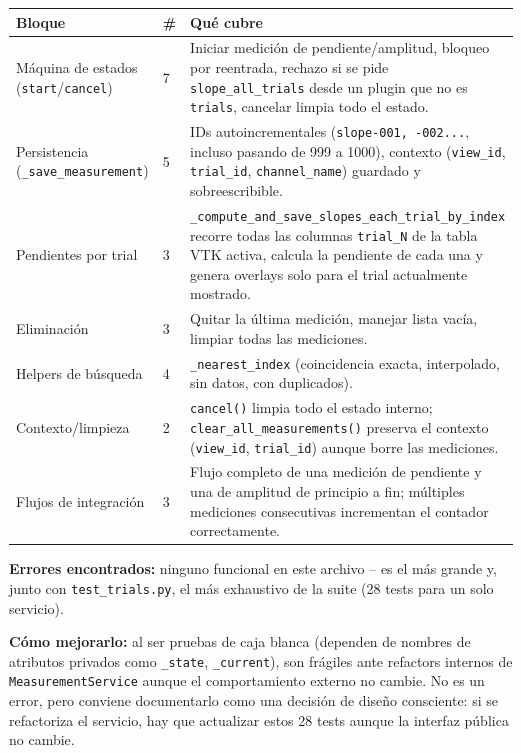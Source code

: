 \documentclass[11pt,a4paper]{article}
\begin{document}
\begin{center}
\begin{longtable}{L{4.5cm}p{1cm}L{7.5cm}}
\toprule
\textbf{Bloque} & \textbf{\#} & \textbf{Qué cubre} \\
\midrule
\endhead
Máquina de estados (\texttt{start}/\texttt{cancel}) & 7 & Iniciar medición de pendiente/amplitud, bloqueo por reentrada, rechazo si se pide \texttt{slope\_\allowbreak all\_\allowbreak trials} desde un plugin que no es \texttt{trials}, cancelar limpia todo el estado. \\
Persistencia (\texttt{\_\allowbreak save\_\allowbreak measurement}) & 5 & IDs autoincrementales (\texttt{slope-001, -002...}, incluso pasando de 999 a 1000), contexto (\texttt{view\_\allowbreak id}, \texttt{trial\_\allowbreak id}, \texttt{channel\_\allowbreak name}) guardado y sobreescribible. \\
Pendientes por trial & 3 & \texttt{\_\allowbreak compute\_\allowbreak and\_\allowbreak save\_\allowbreak slopes\_\allowbreak each\_\allowbreak trial\_\allowbreak by\_\allowbreak index} recorre todas las columnas \texttt{trial\_\allowbreak N} de la tabla VTK activa, calcula la pendiente de cada una y genera overlays solo para el trial actualmente mostrado. \\
Eliminación & 3 & Quitar la última medición, manejar lista vacía, limpiar todas las mediciones. \\
Helpers de búsqueda & 4 & \texttt{\_\allowbreak nearest\_\allowbreak index} (coincidencia exacta, interpolado, sin datos, con duplicados). \\
Contexto/limpieza & 2 & \texttt{cancel()} limpia todo el estado interno; \texttt{clear\_\allowbreak all\_\allowbreak measurements()} preserva el contexto (\texttt{view\_\allowbreak id}, \texttt{trial\_\allowbreak id}) aunque borre las mediciones. \\
Flujos de integración & 3 & Flujo completo de una medición de pendiente y una de amplitud de principio a fin; múltiples mediciones consecutivas incrementan el contador correctamente. \\
\bottomrule
\end{longtable}
\end{center}

\textbf{Errores encontrados:} ninguno funcional en este archivo -- es el más grande y, junto con
\texttt{test\_\allowbreak trials.py}, el más exhaustivo de la suite (28 tests para un solo servicio).

\textbf{Cómo mejorarlo:} al ser pruebas de caja blanca (dependen de nombres de atributos privados como
\texttt{\_\allowbreak state}, \texttt{\_\allowbreak current}), son frágiles ante refactors internos de \texttt{MeasurementService}
aunque el comportamiento externo no cambie. No es un error, pero conviene documentarlo como una decisión de
diseño consciente: si se refactoriza el servicio, hay que actualizar estos 28 tests aunque la interfaz
pública no cambie.
\end{document}
